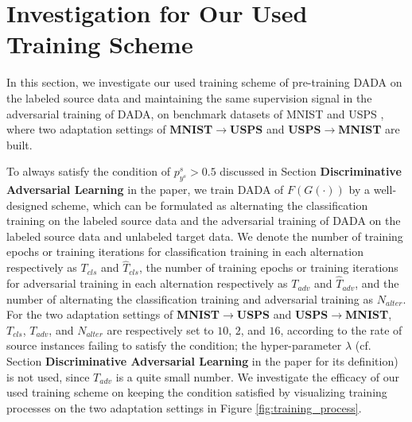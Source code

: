 \documentclass[letterpaper]{article} \usepackage{aaai20}  \usepackage{times}  \usepackage{helvet} \usepackage{courier}  \usepackage[hyphens]{url}  \usepackage{graphicx} \urlstyle{rm} \def\UrlFont{\rm}  \usepackage{graphicx}  \frenchspacing  \setlength{\pdfpagewidth}{8.5in}  \setlength{\pdfpageheight}{11in}
\begin{document}
\section{Investigation for Our Used Training Scheme} 
\label{sec5}
In this section, we investigate our used training scheme of pre-training DADA on the labeled source data and maintaining the same supervision signal in the adversarial training of DADA, on benchmark datasets of MNIST \cite{mnist} and USPS \cite{usps}, where two adaptation settings of \textbf{MNIST}$\rightarrow$\textbf{USPS} and \textbf{USPS}$\rightarrow$\textbf{MNIST} are built.

To always satisfy the condition of $p_{y^s}^s>0.5$ discussed in Section \textbf{Discriminative Adversarial Learning} in the paper, we train DADA of $F(G(\cdot))$ by a well-designed scheme, which can be formulated as alternating the classification training on the labeled source data and the adversarial training of DADA on the labeled source data and unlabeled target data. We denote the number of training epochs or training iterations for classification training in each alternation respectively as $T_{cls}$ and ${\hat{T}}_{cls}$, the number of training epochs or training iterations for adversarial training in each alternation respectively as $T_{adv}$ and ${\hat{T}}_{adv}$, and the number of alternating the classification training and adversarial training as $N_{alter}$. For the two adaptation settings of \textbf{MNIST}$\rightarrow$\textbf{USPS} and \textbf{USPS}$\rightarrow$\textbf{MNIST}, $T_{cls}$, $T_{adv}$, and $N_{alter}$ are respectively set to $10$, $2$, and $16$, according to the rate of source instances failing to satisfy the condition; the hyper-parameter $\lambda$ (cf. Section \textbf{Discriminative Adversarial Learning} in the paper for its definition) is not used, since $T_{adv}$ is a quite small number. We investigate the efficacy of our used training scheme on keeping the condition satisfied by visualizing training processes on the two adaptation settings in Figure \ref{fig:training_process}. 
\end{document}
